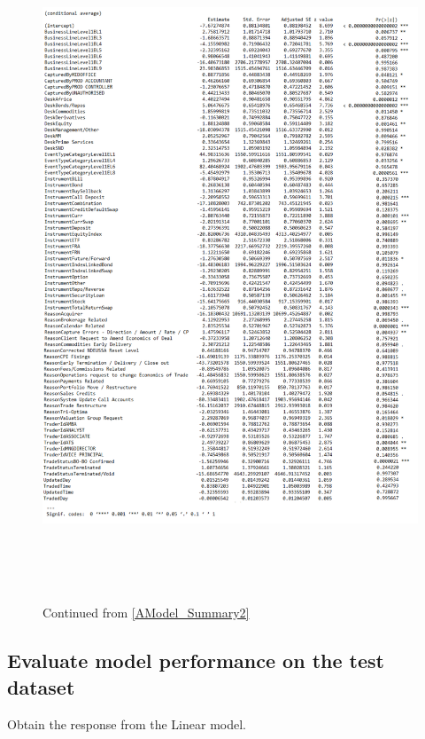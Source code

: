 \documentclass{DissertateUSU}
\begin{document}
\begin{figure}
\centering
\includegraphics[height=20cm, width=15cm]{Get_models_bin3.pdf}
\caption[Poisson GLM Amodel summary statistics continued]{Continued from \ref{AModel_Summary2}}
\label{Poisson GLM Amodel summary statistics continued}
\end{figure}

\subsection{Evaluate model performance on the test dataset}
\label{sec:Evaluate model performance on the test dataset}

Obtain the response from the Linear model.

\small
\end{document}
